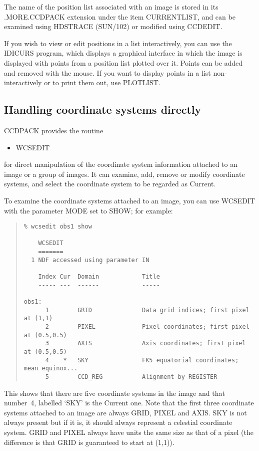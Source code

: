 \documentclass[twoside,11pt]{article}
\newcommand{\htmlref}[2]{#1}
\newcommand{\xref}[3]{#1}
\newcommand{\xlabel}[1]{}
\renewcommand{\_}{\texttt{\symbol{95}}}
\newenvironment{myquote}{\begin{quote}\begin{small}}{\end{small}\end{quote}}
\newcommand{\routine}[1]{{\sc #1}}
\newcommand{\xroutine}[1]{\htmlref{{\sc #1}}{#1}}
\begin{document}
The name of the position list associated with an image is stored
in its .MORE.CCDPACK extension under the item CURRENT\_LIST, and
can be examined using \xref{HDSTRACE (SUN/102)}{sun102}{}
or modified using \xroutine{CCDEDIT}.

If you wish to view or edit positions in a list interactively, 
you can use the \xroutine{IDICURS} program, which displays a 
graphical interface in
which the image is displayed with points from a position list 
plotted over it.  Points can be added and removed with the mouse.
If you want to display points in a list non-interactively or
to print them out, use \xroutine{PLOTLIST}.


\subsection{\xlabel{wcsdirect}\label{wcsdirect}Handling coordinate systems
            directly}

CCDPACK provides the routine
\begin{itemize}
\item \xroutine{WCSEDIT}
\end{itemize}
for direct manipulation of the coordinate system information attached
to an image or a group of images.
It can examine, add, remove or modify coordinate systems, 
and select the coordinate system to be regarded as Current.

To examine the coordinate systems attached to an image, you
can use \routine{WCSEDIT} with the parameter MODE set to SHOW;
for example:
\begin{myquote}
\begin{verbatim}
% wcsedit obs1 show

    WCSEDIT
    =======
  1 NDF accessed using parameter IN

    Index Cur  Domain            Title
    ----- ---  ------            -----

obs1:
      1        GRID              Data grid indices; first pixel at (1,1)
      2        PIXEL             Pixel coordinates; first pixel at (0.5,0.5)
      3        AXIS              Axis coordinates; first pixel at (0.5,0.5)
      4    *   SKY               FK5 equatorial coordinates; mean equinox...
      5        CCD_REG           Alignment by REGISTER
\end{verbatim}
\end{myquote}
This shows that there are five coordinate systems in the image and
that number~4, labelled `SKY' is the Current one.
Note that the first three coordinate systems attached to an image
are always GRID, PIXEL and AXIS.  
SKY is not always present but if it is, it should always represent 
a celestial coordinate system.
GRID and PIXEL always have units the same size as that of a pixel
(the difference is that GRID is guaranteed to start at (1,1)). 
\end{document}
